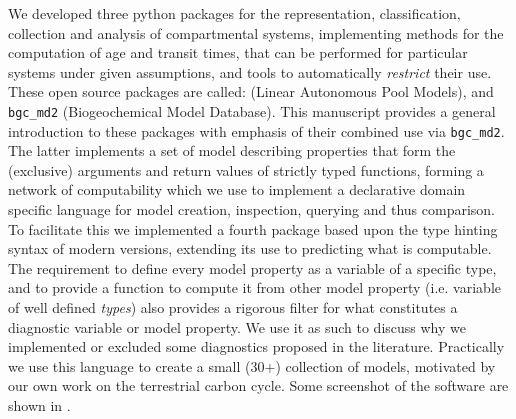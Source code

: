 We developed three python packages for the representation, classification, collection and analysis  of compartmental systems, implementing methods for the computation of age and transit times, that can be performed for particular systems under given assumptions, and tools to automatically \emph{restrict} their use.
These open source packages are called: 
\LAPM{} (Linear Autonomous Pool Models),
\CompartmentalSystems{}  and
\texttt{bgc\_md2} (Biogeochemical Model Database).
This manuscript provides a general introduction to these packages 
with emphasis of their combined use via \texttt{bgc\_md2}.
The latter implements a set of model describing properties that form the (exclusive) arguments and return values of strictly typed functions, forming a network of computability which we use 
to implement a declarative domain specific language for model creation, inspection, querying and thus comparison.
To facilitate this we implemented a fourth package \ComputabilityGraphs{} based upon the  type hinting syntax of modern \python{} versions, extending its use to predicting what is computable.   
The requirement to define every model property as a variable of a specific
type, and to provide a function to compute it from other model property (i.e.
variable of well defined \emph{types}) also provides a rigorous filter for what
constitutes a diagnostic variable or model property. 
We use it as such to discuss why we implemented or excluded some diagnostics proposed in the literature.
Practically we use this language to create a small
(30+) collection of models, motivated by our own work on the terrestrial carbon
cycle.  Some screenshot of the software are shown in .
